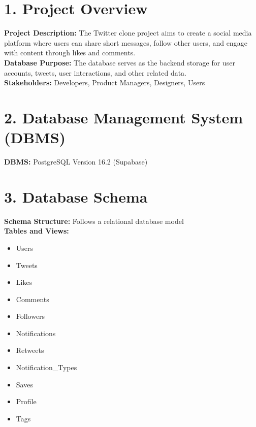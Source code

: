 \documentclass{article}
\begin{document}
\section*{1. Project Overview}
\textbf{Project Description:} The Twitter clone project aims to create a social media platform where users can share short messages, follow other users, and engage with content through likes and comments. \\
\textbf{Database Purpose:} The database serves as the backend storage for user accounts, tweets, user interactions, and other related data. \\
\textbf{Stakeholders:} Developers, Product Managers, Designers, Users

\section*{2. Database Management System (DBMS)}
\textbf{DBMS:} PostgreSQL Version 16.2 (Supabase)

\section*{3. Database Schema}
\textbf{Schema Structure:} Follows a relational database model \\
\textbf{Tables and Views:}
\begin{itemize}[label=--]
    \item Users
    \item Tweets
    \item Likes
    \item Comments
    \item Followers
    \item Notifications
    \item Retweets
    \item Notification\_Types
    \item Saves
    \item Profile
    \item Tags
\end{itemize}
\end{document}
